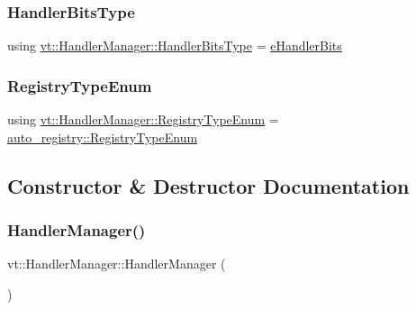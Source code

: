 \subsubsection{\texorpdfstring{Handler\+Bits\+Type}{HandlerBitsType}}
{\footnotesize\ttfamily using \hyperlink{namespacevt_af182285b57b225b163d5d8aff03cb8c2}{vt\+::\+Handler\+Manager\+::\+Handler\+Bits\+Type} =  \hyperlink{namespacevt_af182285b57b225b163d5d8aff03cb8c2}{e\+Handler\+Bits}}

\mbox{\label{structvt_1_1_handler_manager_acebe6230345d7f90400ebe75168aaa0a}} 
\subsubsection{\texorpdfstring{Registry\+Type\+Enum}{RegistryTypeEnum}}
{\footnotesize\ttfamily using \hyperlink{namespacevt_1_1auto__registry_a9f369ca2b484130b396729e2ddf05241}{vt\+::\+Handler\+Manager\+::\+Registry\+Type\+Enum} =  \hyperlink{namespacevt_1_1auto__registry_a9f369ca2b484130b396729e2ddf05241}{auto\+\_\+registry\+::\+Registry\+Type\+Enum}}



\subsection{Constructor \& Destructor Documentation}
\mbox{\label{structvt_1_1_handler_manager_ab14c2718685b0ecd93d39b129c597ec9}} 
\subsubsection{\texorpdfstring{Handler\+Manager()}{HandlerManager()}}
{\footnotesize\ttfamily vt\+::\+Handler\+Manager\+::\+Handler\+Manager (\begin{DoxyParamCaption}{ }\end{DoxyParamCaption})\hspace{0.3cm}{\ttfamily [default]}}



